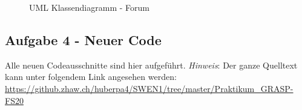 \documentclass[11pt,ngerman]{article}
\begin{document}
    \begin{figure}[H]
        \centering
        \caption{UML Klassendiagramm - Forum}
        \label{fig:UMLKlassendiagramm_Forum}
    \end{figure}

    \subsection{Aufgabe 4 - Neuer Code}
    \label{ssec:Codeausschnitte}
    Alle neuen Codeausschnitte sind hier aufgeführt. \newline
    \textit{Hinweis}: Der ganze Quelltext kann unter folgendem Link angesehen werden: \\ \url{https://github.zhaw.ch/huberpa4/SWEN1/tree/master/Praktikum_GRASP-FS20}
\end{document}

